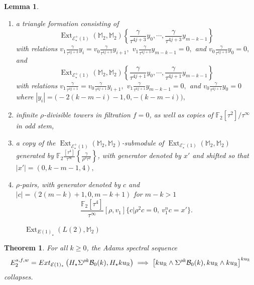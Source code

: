 \documentclass[10pt,a4paper]{amsart}
\newtheorem{lemma}{Lemma}
\newtheorem{theorem}{Theorem}
\DeclareMathOperator{\Ext}{Ext}
\newcommand{\cB}{{\mathcal B}}
\newcommand{\cE}{{\mathcal E}}
\newcommand{\mF}{{\mathbb F}}
\newcommand{\mM}{{\mathbb M}}
\newcommand{\mR}{{\mathbb R}}
\begin{document}
\begin{lemma}
\begin{enumerate} 
\item a triangle formation consisting of \label{classes:negative triangle}
\[ 
\Ext_{\cE^{+}_{\star}(1)}\left(\mM_{2}, \mM_{2}\right) \left\{ \frac{\gamma}{\tau^{4j + 3}}y_0, \cdots, \frac{\gamma}{\tau^{4j + 3}}y_{m-k-1} \right\} 
\]
with relations $v_{1}\frac{\gamma}{\tau^{4j + 3}}y_{i} = v_{0}\frac{\gamma}{\tau^{4j + 3}}y_{i+1},$ $v_{1}\frac{\gamma}{\tau^{4j + 3}}y_{m-k-1} = 0,$ and $v_{0}\frac{\gamma}{\tau^{4j + 3}}y_{0} = 0,$ and 
\[
\Ext_{\cE^{+}_{\star}(1)}\left(\mM_{2}, \mM_{2}\right) \left\{ \frac{\gamma}{\tau^{4j + 1}}y_0, \cdots, \frac{\gamma}{\tau^{4j + 1}}y_{m-k-1} \right\}
\]
with relations $v_{1}\frac{\gamma}{\tau^{4j + 1}} = v_{0}\frac{\gamma}{\tau^{4j + 1}}y_{i+1},$ $v_{1}\frac{\gamma}{\tau^{4j + 1}}y_{m-k-1} = 0,$ and $v_{0}\frac{\gamma}{\tau^{4j + 1}}y_{0} = 0$ where $|y_{i}| = \big(-2(k-m - i)-1, 0, -(k-m - i)\big),$ 
\item infinite $\rho$-divisible towers in filtration $f = 0$, as well as copies of $\mF_{2}[\tau^{2}]/\tau^{\infty}$ in odd stem,
\item a copy of the $\Ext_{\cE^{+}_{\star}(1)}(\mM_{2}, \mM_{2})$-submodule of $\Ext_{\cE^{-}_{\star}(1)}(\mM_{2}, \mM_{2})$ generated by \newline $\mF_{2}\frac{[\tau^{4}]}{\tau^{\infty}} \left\{ \frac{\gamma}{\rho^{2}\tau^{2}} \right\}$, with generator denoted by $x'$ and shifted so that $|x'| = (0, k-m-1, 4),$ 
\item $\rho$-pairs, with generator denoted by $c$ and $|c| = (2(m-k) +1, 0, m-k + 1)$ for $m-k > 1$
\[
\frac{\mF_2[\tau^4]}{\tau^\infty}[\rho, v_{1}]\{c | \rho^{2}c = 0,\ v_1^nc = x'\}.
\]
\end{enumerate}
\end{lemma}

\begin{figure}[ht]
    \centering

\caption{$\Ext_{E(1)_\star}(L(2), \mathbb{M}_2)$} \label{fig:ExtL2M2}
\end{figure}

\begin{theorem}\label{prop: spec seq collapse}
    For all $k \ge 0$, the Adams spectral sequence
   \begin{align*}
E_2^{s, f, w}  = Ext_{\mathcal{E}(1)_\star} \left(H_\star \Sigma^{\rho k} \cB_0(k), H_\star ku_\mR\right) 
      \implies \left[ku_\mR \wedge \Sigma^{\rho k} \cB_{0} (k), ku_\mR \wedge ku_\mR\right]^{ku_\mR}\notag
\end{align*}
collapses.
\end{theorem}
\end{document}
